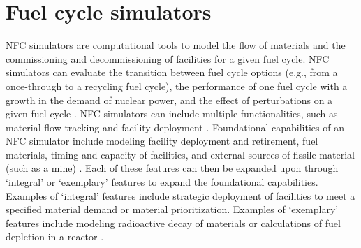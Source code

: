 \section{Fuel cycle simulators}
\gls{NFC} simulators are computational tools to model the flow of materials
and the commissioning and decommissioning of facilities for a given fuel 
cycle. \gls{NFC} simulators can evaluate the transition between fuel cycle 
options (e.g., from a once-through to a recycling fuel cycle), the 
performance of one fuel cycle with a growth in the demand of nuclear power, 
and the effect of perturbations on a given fuel cycle \cite{piet_dynamic_2011}. 
\gls{NFC} simulators can include multiple functionalities, 
such as material flow tracking and facility deployment \cite{brown_identification_2016}.
Foundational capabilities of an \gls{NFC} simulator include modeling 
facility deployment and retirement, fuel materials, timing and capacity of 
facilities, and external sources of fissile material (such as a mine) 
\cite{brown_identification_2016}. Each of these features can then be 
expanded upon through `integral' or `exemplary' features to expand the 
foundational capabilities. Examples of `integral' 
features include strategic deployment of facilities to meet a specified 
material demand or material prioritization. Examples of `exemplary' 
features include modeling radioactive decay of materials or calculations 
of fuel depletion in a reactor \cite{brown_identification_2016}. 

